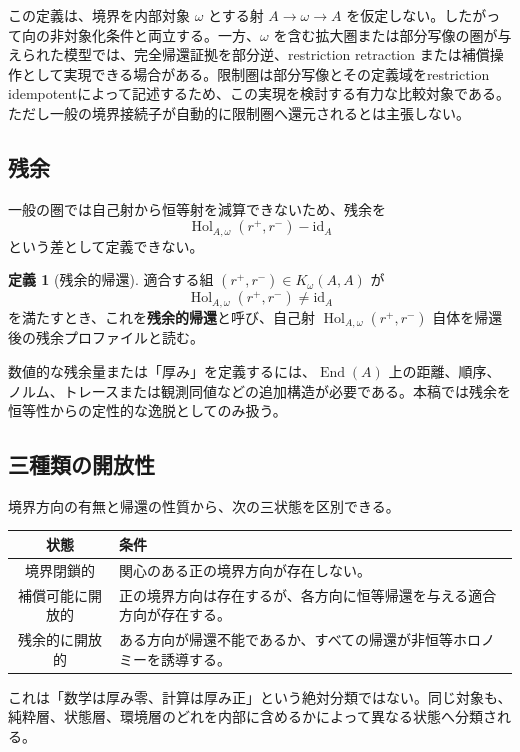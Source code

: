 \documentclass[a4paper,11pt]{ltjsarticle}
\theoremstyle{definition}
\newtheorem{definition}{定義}[section]
\theoremstyle{plain}
\newcommand{\End}{\operatorname{End}}
\newcommand{\id}{\mathrm{id}}
\newcommand{\Hol}{\operatorname{Hol}}
\begin{document}
この定義は、境界を内部対象 $\omega$ とする射 $A\to\omega\to A$ を仮定しない。したがって向の非対象化条件と両立する。一方、$\omega$ を含む拡大圏または部分写像の圏が与えられた模型では、完全帰還証拠を部分逆、restriction retraction または補償操作として実現できる場合がある。限制圏は部分写像とその定義域をrestriction idempotentによって記述するため、この実現を検討する有力な比較対象である\cite{CockettLack2002}。ただし一般の境界接続子が自動的に限制圏へ還元されるとは主張しない。

\subsection{残余}

一般の圏では自己射から恒等射を減算できないため、残余を
\[
 \Hol_{A,\omega}(r^+,r^-)-\id_A
\]
という差として定義できない。

\begin{definition}[残余的帰還]
適合する組 $(r^+,r^-)\in K_\omega(A,A)$ が
\[
 \Hol_{A,\omega}(r^+,r^-)\neq\id_A
\]
を満たすとき、これを\textbf{残余的帰還}と呼び、自己射 $\Hol_{A,\omega}(r^+,r^-)$ 自体を帰還後の残余プロファイルと読む。
\end{definition}

数値的な残余量または「厚み」を定義するには、$\End(A)$ 上の距離、順序、ノルム、トレースまたは観測同値などの追加構造が必要である。本稿では残余を恒等性からの定性的な逸脱としてのみ扱う。

\subsection{三種類の開放性}

境界方向の有無と帰還の性質から、次の三状態を区別できる。
\begin{center}
\begin{tabular}{c p{}}
\toprule
状態 & 条件 \\
\midrule
境界閉鎖的
 & 関心のある正の境界方向が存在しない。 \\
補償可能に開放的
 & 正の境界方向は存在するが、各方向に恒等帰還を与える適合方向が存在する。 \\
残余的に開放的
 & ある方向が帰還不能であるか、すべての帰還が非恒等ホロノミーを誘導する。 \\
\bottomrule
\end{tabular}
\end{center}

これは「数学は厚み零、計算は厚み正」という絶対分類ではない。同じ対象も、純粋層、状態層、環境層のどれを内部に含めるかによって異なる状態へ分類される。
\end{document}
